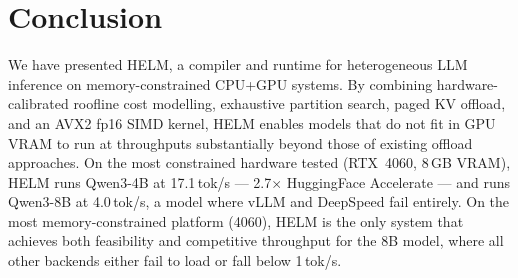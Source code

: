 \documentclass[lettersize,journal]{IEEEtran}
\begin{document}
\section{Conclusion}
\label{sec:conclusion}

We have presented HELM, a compiler and runtime for heterogeneous LLM inference
on memory-constrained CPU+GPU systems. By combining hardware-calibrated
roofline cost modelling, exhaustive partition search, paged KV offload, and
an AVX2 fp16 SIMD kernel, HELM enables models that do not fit in GPU VRAM to
run at throughputs substantially beyond those of existing offload approaches.
On the most constrained hardware tested (RTX~4060, 8\,GB VRAM), HELM runs
Qwen3-4B at 17.1\,tok/s --- 2.7$\times$ HuggingFace Accelerate --- and
runs Qwen3-8B at 4.0\,tok/s, a model where vLLM and DeepSpeed fail entirely.
On the most memory-constrained platform (4060), HELM is the only system
that achieves both feasibility and competitive throughput for the 8B model,
where all other backends either fail to load or fall below 1\,tok/s.
\end{document}
